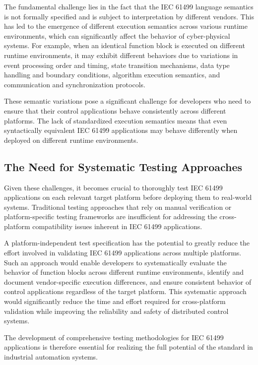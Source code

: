 The fundamental challenge lies in the fact that the IEC 61499 language semantics is not formally specified and is subject to interpretation by different vendors. This has led to the emergence of different execution semantics across various runtime environments, which can significantly affect the behavior of cyber-physical systems. For example, when an identical function block is executed on different runtime environments, it may exhibit different behaviors due to variations in event processing order and timing, state transition mechanisms, data type handling and boundary conditions, algorithm execution semantics, and communication and synchronization protocols.

These semantic variations pose a significant challenge for developers who need to ensure that their control applications behave consistently across different platforms. The lack of standardized execution semantics means that even syntactically equivalent IEC 61499 applications may behave differently when deployed on different runtime environments.

\subsection{The Need for Systematic Testing Approaches}

Given these challenges, it becomes crucial to thoroughly test IEC 61499 applications on each relevant target platform before deploying them to real-world systems. Traditional testing approaches that rely on manual verification or platform-specific testing frameworks are insufficient for addressing the cross-platform compatibility issues inherent in IEC 61499 applications.

A platform-independent test specification has the potential to greatly reduce the effort involved in validating IEC 61499 applications across multiple platforms. Such an approach would enable developers to systematically evaluate the behavior of function blocks across different runtime environments, identify and document vendor-specific execution differences, and ensure consistent behavior of control applications regardless of the target platform. This systematic approach would significantly reduce the time and effort required for cross-platform validation while improving the reliability and safety of distributed control systems.

The development of comprehensive testing methodologies for IEC 61499 applications is therefore essential for realizing the full potential of the standard in industrial automation systems.

